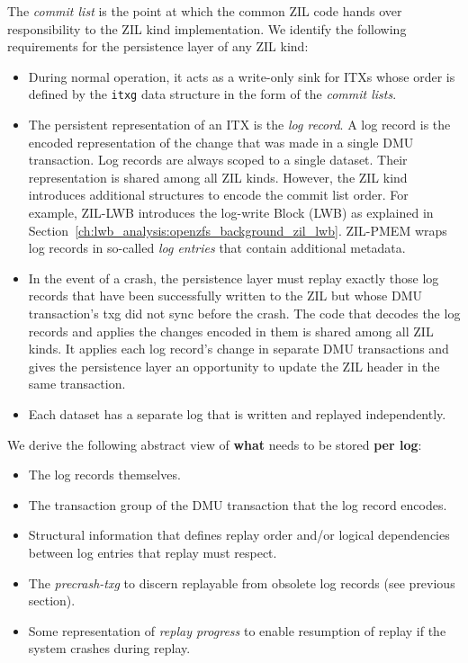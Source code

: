 \documentclass[12pt,a4paper,twoside]{book}
\begin{document}
The \textit{commit list} is the point at which the common ZIL code hands over responsibility to the ZIL kind implementation.
We identify the following requirements for the persistence layer of any ZIL kind:
\begin{itemize}[noitemsep,beginpenalty=100000,midpenalty=100000]
\item During normal operation, it acts as a write-only sink for ITXs whose order is defined by the \lstinline{itxg} data structure in the form of the \textit{commit lists}.
\item The persistent representation of an ITX is the \textit{log record}.
    A log record is the encoded representation of the change that was made in a single DMU transaction.
    Log records are always scoped to a single dataset.
    Their representation is shared among all ZIL kinds.
    However, the ZIL kind introduces additional structures to encode the commit list order.
    For example, ZIL-LWB introduces the log-write Block (LWB) as explained in Section~\ref{ch:lwb_analysis:openzfs_background_zil_lwb}.
    ZIL-PMEM wraps log records in so-called \textit{log entries} that contain additional metadata.
\item In the event of a crash, the persistence layer must replay exactly those log records that have been successfully written to the ZIL but whose DMU transaction's txg did not sync before the crash.
    The code that decodes the log records and applies the changes encoded in them is shared among all ZIL kinds.
    It applies each log record's change in separate DMU transactions and gives the persistence layer an opportunity to update the ZIL header in the same transaction.
\item Each dataset has a separate log that is written and replayed independently.
\end{itemize}
We derive the following abstract view of \textbf{what} needs to be stored \textbf{per log}:
\begin{itemize}[noitemsep,beginpenalty=100000,midpenalty=100000]
    \item The log records themselves.
    \item The transaction group of the DMU transaction that the log record encodes.
    \item Structural information that defines replay order and/or logical dependencies between log entries that replay must respect.
    \item The \textit{precrash-txg} to discern replayable from obsolete log records (see previous section).
    \item Some representation of \textit{replay progress} to enable resumption of replay if the system crashes during replay.
\end{itemize}
\end{document}
